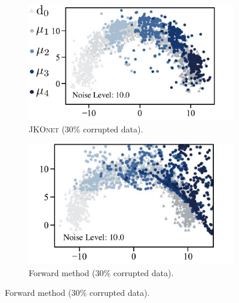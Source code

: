 \begin{figure}[t]
     \centering
     \begin{subfigure}[b]{0.49\textwidth}
         \centering
         \includegraphics[width=\textwidth]{figures/fig_predictions_jko_noise.pdf}
         \caption{\textsc{JKOnet} (30\% corrupted data).}
     \end{subfigure}
     \hfill
     \begin{subfigure}[b]{0.47\textwidth}
         \centering
         \includegraphics[width=\textwidth]{figures/fig_predictions_forward_noise.pdf}
         \caption{Forward method (30\% corrupted data).}
     \end{subfigure}
     

\end{figure}
